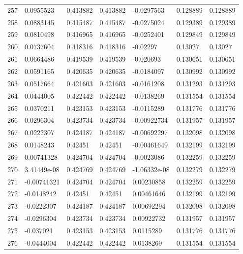 \begin{longtable}{l|lll|lll}
 257 &  0.0955523   & 0.413882    & 0.413882    & -0.0297563   & 0.128889    & 0.128889    \\
 258 &  0.0883145   & 0.415487    & 0.415487    & -0.0275024   & 0.129389    & 0.129389    \\
 259 &  0.0810498   & 0.416965    & 0.416965    & -0.0252401   & 0.129849    & 0.129849    \\
 260 &  0.0737604   & 0.418316    & 0.418316    & -0.02297     & 0.13027     & 0.13027     \\
 261 &  0.0664486   & 0.419539    & 0.419539    & -0.020693    & 0.130651    & 0.130651    \\
 262 &  0.0591165   & 0.420635    & 0.420635    & -0.0184097   & 0.130992    & 0.130992    \\
 263 &  0.0517664   & 0.421603    & 0.421603    & -0.0161208   & 0.131293    & 0.131293    \\
 264 &  0.0444005   & 0.422442    & 0.422442    & -0.0138269   & 0.131554    & 0.131554    \\
 265 &  0.0370211   & 0.423153    & 0.423153    & -0.0115289   & 0.131776    & 0.131776    \\
 266 &  0.0296304   & 0.423734    & 0.423734    & -0.00922734  & 0.131957    & 0.131957    \\
 267 &  0.0222307   & 0.424187    & 0.424187    & -0.00692297  & 0.132098    & 0.132098    \\
 268 &  0.0148243   & 0.42451     & 0.42451     & -0.00461649  & 0.132199    & 0.132199    \\
 269 &  0.00741328  & 0.424704    & 0.424704    & -0.0023086   & 0.132259    & 0.132259    \\
 270 &  3.41449e-08 & 0.424769    & 0.424769    & -1.06332e-08 & 0.132279    & 0.132279    \\
 271 & -0.00741321  & 0.424704    & 0.424704    &  0.00230858  & 0.132259    & 0.132259    \\
 272 & -0.0148242   & 0.42451     & 0.42451     &  0.00461646  & 0.132199    & 0.132199    \\
 273 & -0.0222307   & 0.424187    & 0.424187    &  0.00692294  & 0.132098    & 0.132098    \\
 274 & -0.0296304   & 0.423734    & 0.423734    &  0.00922732  & 0.131957    & 0.131957    \\
 275 & -0.037021    & 0.423153    & 0.423153    &  0.0115289   & 0.131776    & 0.131776    \\
 276 & -0.0444004   & 0.422442    & 0.422442    &  0.0138269   & 0.131554    & 0.131554    \\

\end{longtable}
